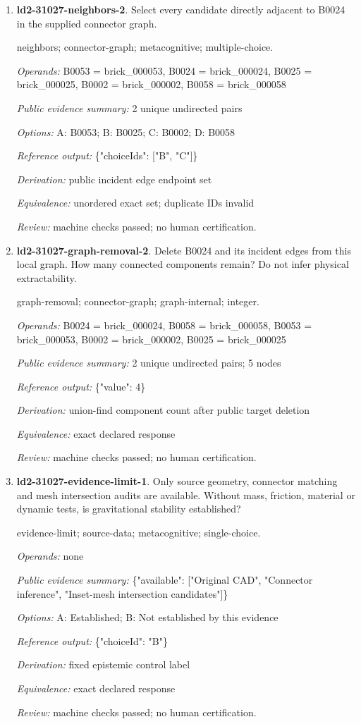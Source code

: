 \begin{enumerate}
\item \textbf{ld2-31027-neighbors-2}. Select every candidate directly adjacent to B0024 in the supplied connector graph.
\par{\small neighbors; connector-graph; metacognitive; multiple-choice.\par\textit{Operands:} B0053 = brick\_000053, B0024 = brick\_000024, B0025 = brick\_000025, B0002 = brick\_000002, B0058 = brick\_000058\par\textit{Public evidence summary:} 2 unique undirected pairs\par\textit{Options:} A: B0053; B: B0025; C: B0002; D: B0058\par\textit{Reference output:} \{"choiceIds": ["B", "C"]\}\par\textit{Derivation:} public incident edge endpoint set\par\textit{Equivalence:} unordered exact set; duplicate IDs invalid\par\textit{Review:} machine checks passed; no human certification.}
\item \textbf{ld2-31027-graph-removal-2}. Delete B0024 and its incident edges from this local graph. How many connected components remain? Do not infer physical extractability.
\par{\small graph-removal; connector-graph; graph-internal; integer.\par\textit{Operands:} B0024 = brick\_000024, B0058 = brick\_000058, B0053 = brick\_000053, B0002 = brick\_000002, B0025 = brick\_000025\par\textit{Public evidence summary:} 2 unique undirected pairs; 5 nodes\par\textit{Reference output:} \{"value": 4\}\par\textit{Derivation:} union-find component count after public target deletion\par\textit{Equivalence:} exact declared response\par\textit{Review:} machine checks passed; no human certification.}
\item \textbf{ld2-31027-evidence-limit-1}. Only source geometry, connector matching and mesh intersection audits are available. Without mass, friction, material or dynamic tests, is gravitational stability established?
\par{\small evidence-limit; source-data; metacognitive; single-choice.\par\textit{Operands:} none\par\textit{Public evidence summary:} \{"available": ["Original CAD", "Connector inference", "Inset-mesh intersection candidates"]\}\par\textit{Options:} A: Established; B: Not established by this evidence\par\textit{Reference output:} \{"choiceId": "B"\}\par\textit{Derivation:} fixed epistemic control label\par\textit{Equivalence:} exact declared response\par\textit{Review:} machine checks passed; no human certification.}

\end{enumerate}
